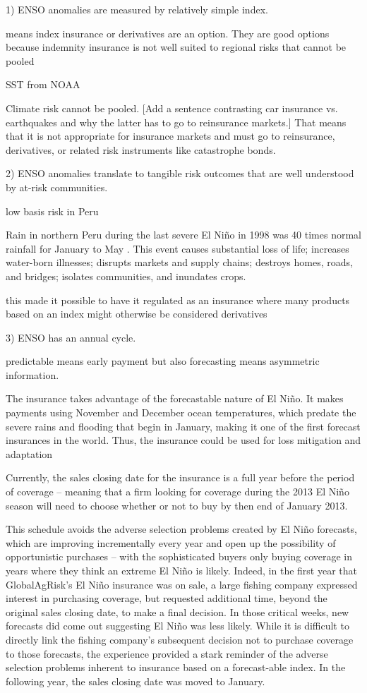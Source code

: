 \documentclass[authoryear]{article}
\begin{document}
1) ENSO anomalies are measured by relatively simple index.

means index insurance or derivatives are an option. They are good options because indemnity insurance is not well suited to regional risks that cannot be pooled 

SST from NOAA

Climate risk cannot be pooled. [Add a sentence contrasting car insurance vs. earthquakes and why the latter has to go to reinsurance markets.] That means that it is not appropriate for insurance markets and must go to reinsurance, derivatives, or related risk instruments like catastrophe bonds.


2) ENSO anomalies translate to tangible risk outcomes that are well understood by at-risk communities.

low basis risk in Peru 

Rain in northern Peru during the last severe El Ni\~no in 1998 was 40 times normal rainfall for January to May \citep{skees2009enso}. This event causes substantial loss of life; increases water-born illnesses; disrupts markets and supply chains; destroys homes, roads, and bridges; isolates communities, and inundates crops.

this made it possible to have it regulated as an insurance where many products based on an index might otherwise be considered derivatives

3) ENSO has an annual cycle.

predictable means early payment but also forecasting means asymmetric information. 

The insurance takes advantage of the forecastable nature of El Ni\~no. It makes payments using November and December ocean temperatures, which predate the severe rains and flooding that begin in January, making it one of the first forecast insurances in the world. Thus, the insurance could be used for loss mitigation and adaptation

Currently, the sales closing date for the insurance is a full year before the period of coverage – meaning that a firm looking for coverage during the 2013 El Ni\~no season will need to choose whether or not to buy by then end of January 2013. 

This schedule avoids the adverse selection problems created by El Ni\~no forecasts, which are improving incrementally every year and open up the possibility of opportunistic purchases – with the sophisticated buyers only buying coverage in years where they think an extreme El Ni\~no is likely. Indeed, in the first year that GlobalAgRisk’s El Ni\~no insurance was on sale, a large fishing company expressed interest in purchasing coverage, but requested additional time, beyond the original sales closing date, to make a final decision. In those critical weeks, new forecasts did come out suggesting El Ni\~no was less likely. While it is difficult to directly link the fishing company's subsequent decision not to purchase coverage to those forecasts, the experience provided a stark reminder of the adverse selection problems inherent to insurance based on a forecast-able index. In the following year, the sales closing date was moved to January.
\end{document}
